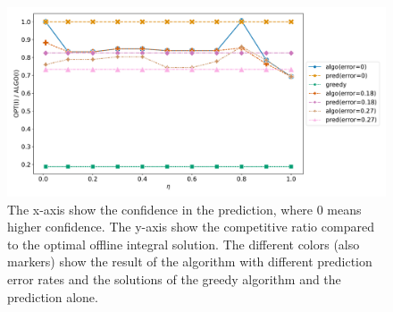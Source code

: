 
\begin{figure}
    \includegraphics[width=\linewidth]{Img/figure1.pdf}
    \caption{The x-axis show the confidence in the prediction, where 0 means higher confidence. The y-axis show the competitive ratio compared to the optimal offline integral solution. The different colors (also markers) show the result of the algorithm with different prediction error rates and the solutions of the greedy algorithm and the prediction alone.}
    \label{fig:experiment}
\end{figure}

